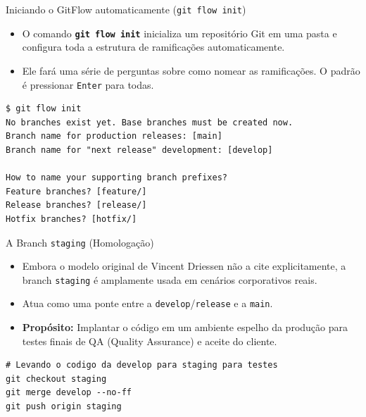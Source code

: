 \documentclass[aspectratio=169]{beamer}
\begin{document}
\begin{frame}[fragile]{Iniciando o GitFlow automaticamente (\texttt{git flow init})}
    \begin{itemize}
        \item O comando \textbf{\texttt{git flow init}} inicializa um repositório Git em uma pasta e configura toda a estrutura de ramificações automaticamente.
        \item Ele fará uma série de perguntas sobre como nomear as ramificações. O padrão é pressionar \texttt{Enter} para todas.
    \end{itemize}
    \vspace{0.3cm}
\begin{lstlisting}[basicstyle=\ttfamily\scriptsize]
$ git flow init
No branches exist yet. Base branches must be created now.
Branch name for production releases: [main] 
Branch name for "next release" development: [develop] 

How to name your supporting branch prefixes?
Feature branches? [feature/] 
Release branches? [release/] 
Hotfix branches? [hotfix/] 
\end{lstlisting}
\end{frame}

\begin{frame}[fragile]{A Branch \texttt{staging} (Homologação)}
    \begin{itemize}
        \item Embora o modelo original de Vincent Driessen não a cite explicitamente, a branch \texttt{staging} é amplamente usada em cenários corporativos reais.
        \item Atua como uma ponte entre a \texttt{develop}/\texttt{release} e a \texttt{main}.
        \item \textbf{Propósito:} Implantar o código em um ambiente espelho da produção para testes finais de QA (Quality Assurance) e aceite do cliente.
    \end{itemize}
    \vspace{0.3cm}
\begin{lstlisting}
# Levando o codigo da develop para staging para testes
git checkout staging
git merge develop --no-ff
git push origin staging
\end{lstlisting}
\end{frame}
\end{document}
